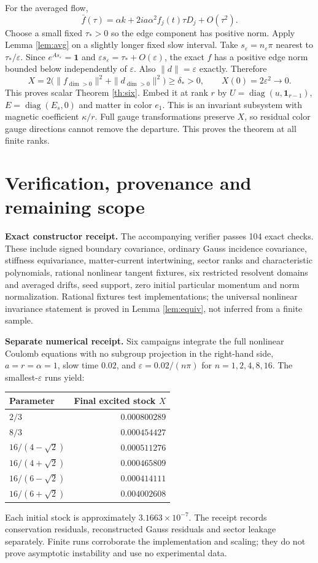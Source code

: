 \documentclass[11pt,a4paper]{article}
\newcommand{\id}{\mathbf1}\newcommand{\tr}{\operatorname{tr}}\newcommand{\diag}{\operatorname{diag}}\newcommand{\Fix}{\operatorname{Fix}}\newcommand{\Rea}{\operatorname{Re}}
\begin{document}
For the averaged flow,
\[
\bar f(\tau)=\alpha k+2ia\alpha^2f_j(t)\tau D_j+O(\tau^2).
\]
Choose a small fixed $\tau_*>0$ so the edge component has positive norm. Apply Lemma \ref{lem:avg} on a slightly longer fixed slow interval. Take $s_\varepsilon=n_\varepsilon\pi$ nearest to $\tau_*/\varepsilon$. Since $e^{As_\varepsilon}=\id$ and $\varepsilon s_\varepsilon=\tau_*+O(\varepsilon)$, the exact $f$ has a positive edge norm bounded below independently of $\varepsilon$. Also $\|d\|=\varepsilon$ exactly. Therefore
\[
X=2\bigl(\|f_{\dim>0}\|^2+\|d_{\dim>0}\|^2\bigr)\geq\delta_*>0,
\qquad X(0)=2\varepsilon^2\longrightarrow0.
\]
This proves scalar Theorem \ref{th:six}. Embed it at rank $r$ by $U=\diag(u,\id_{r-1})$, $E=\diag(E_s,0)$ and matter in color $e_1$. This is an invariant subsystem with magnetic coefficient $\kappa/r$. Full gauge transformations preserve $X$, so residual color gauge directions cannot remove the departure. This proves the theorem at all finite ranks.

\newpage
\section{Verification, provenance and remaining scope}
\textbf{Exact constructor receipt.} The accompanying verifier passes 104 exact checks. These include signed boundary covariance, ordinary Gauss incidence covariance, stiffness equivariance, matter-current intertwining, sector ranks and characteristic polynomials, rational nonlinear tangent fixtures, six restricted resolvent domains and averaged drifts, seed support, zero initial particular momentum and norm normalization. Rational fixtures test implementations; the universal nonlinear invariance statement is proved in Lemma \ref{lem:equiv}, not inferred from a finite sample.

\textbf{Separate numerical receipt.} Six campaigns integrate the full nonlinear Coulomb equations with no subgroup projection in the right-hand side, $a=r=\alpha=1$, slow time $0.02$, and $\varepsilon=0.02/(n\pi)$ for $n=1,2,4,8,16$. The smallest-$\varepsilon$ runs yield:
\begin{center}
\begin{tabular}{lr}
\toprule
Parameter & Final excited stock $X$\\
\midrule
$2/3$ & $0.000800289$\\
$8/3$ & $0.000454427$\\
$16/(4-\sqrt2)$ & $0.000511276$\\
$16/(4+\sqrt2)$ & $0.000465809$\\
$16/(6-\sqrt2)$ & $0.000414111$\\
$16/(6+\sqrt2)$ & $0.004002608$\\
\bottomrule
\end{tabular}
\end{center}
Each initial stock is approximately $3.1663\times10^{-7}$. The receipt records conservation residuals, reconstructed Gauss residuals and sector leakage separately. Finite runs corroborate the implementation and scaling; they do not prove asymptotic instability and use no experimental data.
\end{document}
